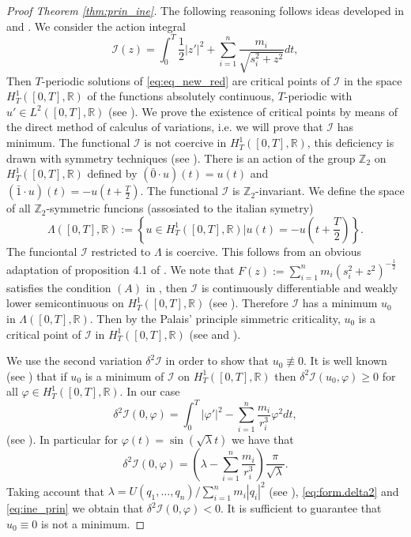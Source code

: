 \documentclass[twoside]{article}
\theoremstyle{remark}
\newcommand{\rr}{\mathbb{R}}
\begin{document}
\begin{proof}[Proof Theorem \ref{thm:prin_ine}] The following reasoning follows ideas developed in \cite{zhao2015nonplanar} and \cite{li2013characterization}.  We consider the action integral
\[\mathcal{I}(z)=\int_0^T\frac12|z'|^2+\sum_{i=1}^n\frac{m_i}{\sqrt{s_i^2+z^2}}dt,\]
Then $T$-periodic solutions of \eqref{eq:eq_new_red} are critical points of $\mathcal{I}$ in the space $H^1_T([0,T],\rr)$ of the functions  absolutely continuous, $T$-periodic with $u'\in L^2([0,T],\rr)$ (see \cite[Cor. 1.1]{Mawhin2010}). We prove the existence of critical points by means of the direct method of calculus of variations, i.e. we will prove that $\mathcal{I}$ has minimum.  The functional $\mathcal{I}$ is not coercive in $H^1_T([0,T],\rr)$,  this deficiency is drawn with symmetry techniques (see \cite{David-2004}). There is an action of the group $\mathbb{Z}_2$ on $H^1_T([0,T],\rr)$ defined by $(\bar{0}\cdot u)(t)=u(t)$ and $(\bar{1}\cdot u)(t)=-u(t+\frac{T}{2})$. The functional $\mathcal{I}$ is $\mathbb{Z}_2$-invariant. We define the space of all $\mathbb{Z}_2$-symmetric funcions (assosiated to the italian symetry) \[\Lambda([0,T],\mathbb{R}):=\left\{ u\in H^1_T([0,T],\rr) | u(t)=-u\left(t+\frac{T}{2}\right)\right\}.\]
The funciontal $\mathcal{I}$ restricted to $\Lambda$  is coercive. This follows from an obvious adaptation of proposition 4.1 of \cite{David-2004}. We note that $F(z):=\sum_{i=1}^nm_i(s_i^2+z^2)^{-\frac{1}{2}}$ satisfies the condition $(A)$ in \cite[p. 12]{Mawhin2010}, then $\mathcal{I}$  is continuously differentiable and weakly lower semicontinuous on $H_{T}^1([0,T],\rr)$ (see \cite[p. 13]{Mawhin2010}). Therefore $\mathcal{I}$ has a minimum $u_0$ in $\Lambda([0,T],\mathbb{R})$. Then by the Palais' principle simmetric criticality,  $u_0$ is a critical point of $\mathcal{I}$ in $H^1_T([0,T],\rr)$ (see \cite{David-2004} and \cite{RichardPalais274}).

We use the second variation $\delta^2 \mathcal{I}$ in order to show  that $u_0\nequiv 0$. It is well known (see \cite[Th. 1.3.1]{jost1998calculus}) that if $u_0$ is a minimum of $\mathcal{I}$ on $H^1_T([0,T],\rr)$  then $\delta^2 \mathcal{I} (u_0,\varphi)\geq 0$ for all $\varphi\in H^1_T([0,T],\rr)$. In our case
\[\delta^2\mathcal{I}(0,\varphi)=\int_0^T |\varphi'|^2-\sum_{i=1}^{n}\frac{m_i}{r_i^3}\varphi^2 dt,\]
(see \cite[Eq. 1.3.6]{jost1998calculus}). In particular for $\varphi(t)=\sin (\sqrt{\lambda}t)$ we have that
\begin{equation}\label{eq:form.delta2}
 \delta^2 \mathcal{I} (0,\varphi)=\left( \lambda-\sum_{i=1}^{n}\frac{m_i}{r_i^3} \right)\frac{\pi}{\sqrt{\lambda}}.
\end{equation}
Taking account that $\lambda=U(q_1,\ldots,q_n)/\sum_{i=1}^{n}m_i|q_i|^2$  (see \cite[p. 109]{JaumeLlibre276}),  \eqref{eq:form.delta2} and \eqref{eq:ine_prin} we obtain that $\delta^2\mathcal{I}(0,\varphi)<0$. It is sufficient  to guarantee that $u_0\equiv 0$ is not a minimum.



\end{proof}
\end{document}
